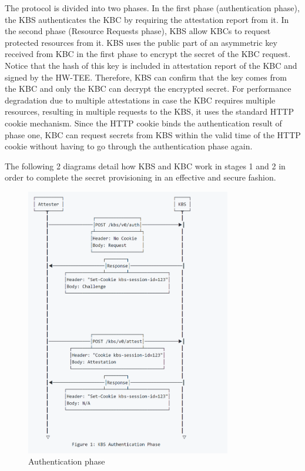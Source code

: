 The protocol is divided into two phases. In the first phase (authentication phase), the KBS authenticates the KBC by requiring the attestation report from it. In the second phase (Resource Requests phase), KBS allow KBCs to request protected resources from it. 
KBS uses the public part of an asymmetric key received from KBC in the first phase to encrypt the secret of the KBC request. Notice that the hash of this key is included in attestation report of the KBC and signed by the HW-TEE. Therefore, KBS 
can confirm that the key comes from the KBC and only the KBC can decrypt the encrypted secret. For performance degradation due to multiple attestations in case the KBC requires multiple resources, resulting in multiple requests to the KBS, 
it uses the standard HTTP cookie mechanism.  Since the HTTP cookie binds the authentication result of phase one, KBC can request secrets from KBS within the valid time of the HTTP cookie without having to go through the authentication phase again.

The following 2 diagrams detail how KBS and KBC work in stages 1 and 2 in order to complete the secret provisioning in an effective and secure fashion.
\begin{figure}[H]
    \centering
    \includegraphics[width=0.8\textwidth]{images/attestation.PNG}
    \caption[Authentication phase]{Authentication phase}
    \label{fig:Authentication}
\end{figure}

